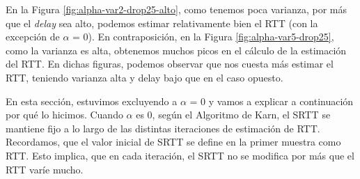 En la Figura \ref{fig:alpha-var2-drop25-alto}, como tenemos poca varianza, por más que el \emph{delay} sea alto, podemos estimar relativamente bien el RTT (con la excepción de $\alpha$ = 0). En contraposición, en la Figura \ref{fig:alpha-var5-drop25}, como la varianza es alta, obtenemos  muchos picos en el cálculo de la estimación del RTT. En dichas figuras, podemos observar que nos cuesta más estimar el RTT, teniendo varianza alta y delay bajo que en el caso opuesto.

En esta sección, estuvimos excluyendo a $\alpha$ = 0 y vamos a explicar a continuación por qué lo hicimos. Cuando $\alpha$ es 0, según el Algoritmo de Karn, el SRTT se mantiene fijo a lo largo de las distintas iteraciones de estimación de RTT. Recordamos, que el valor inicial de SRTT se define en la primer muestra como RTT. Esto implica, que en cada iteración, el SRTT no se modifica por más que el RTT varíe mucho.

